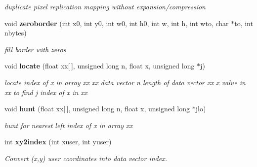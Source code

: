 \begin{CompactItemize}
\begin{CompactList}\small\item\em duplicate pixel replication mapping without expansion/compression \item\end{CompactList}\item 
void {\bf zeroborder} (int x0, int y0, int w0, int h0, int w, int h, int wto, char $\ast$to, int nbytes)
\begin{CompactList}\small\item\em fill border with zeros \item\end{CompactList}\item 
void {\bf locate} (float xx[$\,$], unsigned long n, float x, unsigned long $\ast$j)\label{xtvutils_8c_a229}

\begin{CompactList}\small\item\em locate index of x in array xx xx data vector n length of data vector xx x value in xx to find j index of x in xx \item\end{CompactList}\item 
void {\bf hunt} (float xx[$\,$], unsigned long n, float x, unsigned long $\ast$jlo)
\begin{CompactList}\small\item\em hunt for nearest left index of x in array xx \item\end{CompactList}\item 
int {\bf xy2index} (int xuser, int yuser)
\begin{CompactList}\small\item\em Convert (x,y) user coordinates into data vector index. \item\end{CompactList}\end{CompactItemize}
